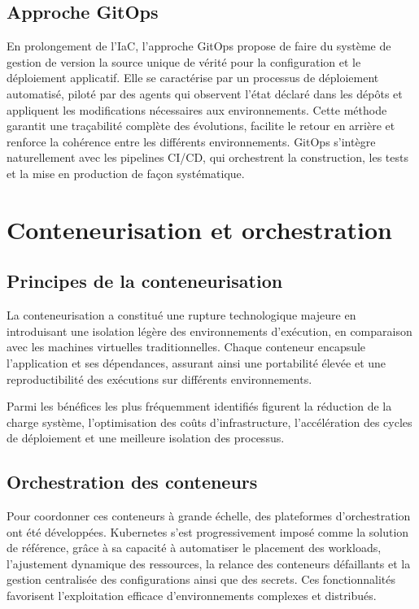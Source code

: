 \subsection{Approche GitOps}

En prolongement de l’IaC, l’approche GitOps propose de faire du système de gestion de version la source unique de vérité pour la configuration et le déploiement applicatif. Elle se caractérise par un processus de déploiement automatisé, piloté par des agents qui observent l’état déclaré dans les dépôts et appliquent les modifications nécessaires aux environnements. Cette méthode garantit une traçabilité complète des évolutions, facilite le retour en arrière et renforce la cohérence entre les différents environnements. GitOps s’intègre naturellement avec les pipelines CI/CD, qui orchestrent la construction, les tests et la mise en production de façon systématique.

\section{Conteneurisation et orchestration}

\subsection{Principes de la conteneurisation}

La conteneurisation a constitué une rupture technologique majeure en introduisant une isolation légère des environnements d’exécution, en comparaison avec les machines virtuelles traditionnelles. Chaque conteneur encapsule l’application et ses dépendances, assurant ainsi une portabilité élevée et une reproductibilité des exécutions sur différents environnements.

Parmi les bénéfices les plus fréquemment identifiés figurent la réduction de la charge système, l’optimisation des coûts d’infrastructure, l’accélération des cycles de déploiement et une meilleure isolation des processus.

\subsection{Orchestration des conteneurs}

Pour coordonner ces conteneurs à grande échelle, des plateformes d’orchestration ont été développées. Kubernetes s’est progressivement imposé comme la solution de référence, grâce à sa capacité à automatiser le placement des workloads, l’ajustement dynamique des ressources, la relance des conteneurs défaillants et la gestion centralisée des configurations ainsi que des secrets. Ces fonctionnalités favorisent l’exploitation efficace d’environnements complexes et distribués.

